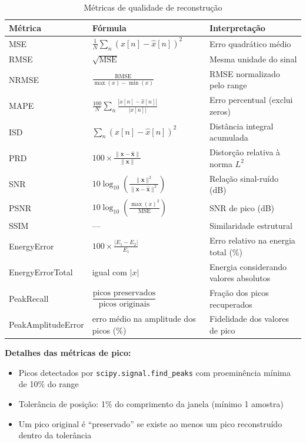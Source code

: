 \documentclass[12pt, a4paper]{article}
\begin{document}
\begin{table}[H]
\centering
\caption{Métricas de qualidade de reconstrução}
\begin{tabular}{llp{5.5cm}}
\toprule
\textbf{Métrica} & \textbf{Fórmula} & \textbf{Interpretação} \\
\midrule
MSE  & $\displaystyle\frac{1}{N}\sum_{n}(x[n]-\hat{x}[n])^2$ & Erro quadrático médio \\[8pt]
RMSE & $\sqrt{\mathrm{MSE}}$ & Mesma unidade do sinal \\[4pt]
NRMSE & $\displaystyle\frac{\mathrm{RMSE}}{\max(x)-\min(x)}$ & RMSE normalizado pelo range \\[8pt]
MAPE & $\displaystyle\frac{100}{N}\sum_{n}\frac{|x[n]-\hat{x}[n]|}{|x[n]|}$ & Erro percentual (exclui zeros) \\[8pt]
ISD  & $\displaystyle\sum_{n}(x[n]-\hat{x}[n])^2$ & Distância integral acumulada \\[8pt]
PRD  & $\displaystyle100\times\frac{\|\mathbf{x}-\hat{\mathbf{x}}\|}{\|\mathbf{x}\|}$ & Distorção relativa à norma $L^2$ \\[8pt]
SNR  & $\displaystyle10\log_{10}\!\left(\frac{\|\mathbf{x}\|^2}{\|\mathbf{x}-\hat{\mathbf{x}}\|^2}\right)$ & Relação sinal-ruído (dB) \\[8pt]
PSNR & $\displaystyle10\log_{10}\!\left(\frac{\max(x)^2}{\mathrm{MSE}}\right)$ & SNR de pico (dB) \\[8pt]
SSIM & — & Similaridade estrutural~\cite{wang2004ssim} \\[4pt]
EnergyError & $\displaystyle100\times\frac{|E_1 - E_2|}{E_1}$ & Erro relativo na energia total (\%) \\[8pt]
EnergyErrorTotal & igual com $|x|$ & Energia considerando valores absolutos \\[4pt]
PeakRecall & $\dfrac{\text{picos preservados}}{\text{picos originais}}$ & Fração dos picos recuperados \\[8pt]
PeakAmplitudeError & erro médio na amplitude dos picos (\%) & Fidelidade dos valores de pico \\
\bottomrule
\end{tabular}
\end{table}

\textbf{Detalhes das métricas de pico:}
\begin{itemize}
    \item Picos detectados por \texttt{scipy.signal.find\_peaks} com proeminência mínima de 10\% do range
    \item Tolerância de posição: 1\% do comprimento da janela (mínimo 1 amostra)
    \item Um pico original é ``preservado'' se existe ao menos um pico reconstruído dentro da tolerância
\end{itemize}
\end{document}
